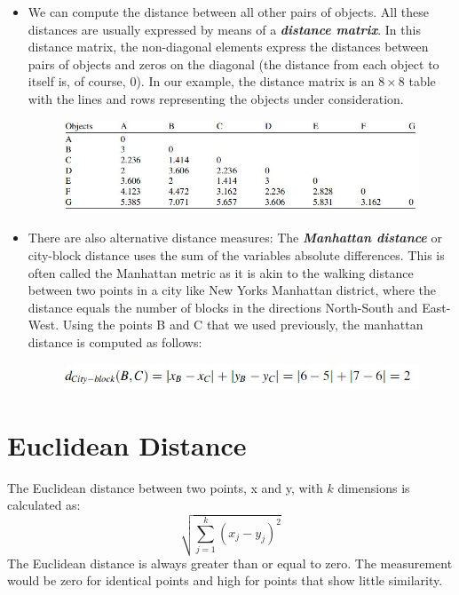 \documentclass[a4paper,12pt]{report}
\begin{document}
\begin{itemize}
	\item We can compute the distance between all other pairs of objects. All
	these distances are usually expressed by means of a \textit{\textbf{distance matrix}}. In this distance
	matrix, the non-diagonal elements express the distances between pairs of objects
	and zeros on the diagonal (the distance from each object to itself is, of course, 0). In
	our example, the distance matrix is an $8 \times 8$ table with the lines and rows
	representing the objects under consideration.
	\begin{figure}[h!]
		\begin{center}
			\includegraphics[scale=0.6]{images/DistanceMatrix.jpg}\\
		\end{center}
	\end{figure}
	
	\item There are also alternative distance measures: The \textbf{\textit{Manhattan distance}} or city-block distance uses the sum of the variables absolute differences. This is often called the Manhattan metric
	as it is akin to the walking distance between two points in a city like New Yorks
	Manhattan district, where the distance equals the number of blocks in the directions
	North-South and East-West. Using the points B and C that we used previously, the manhattan distance is computed as follows:
	\begin{figure}[h!]
		\begin{center}
			\includegraphics[scale=0.6]{images/Manhattan.jpg}\\
		\end{center}
	\end{figure}
	
	
	
	
	
	
\end{itemize}

\section{Euclidean Distance}
The Euclidean distance between two points, x and y, with $k$ dimensions is calculated as:
\[ \sqrt{ \sum^{k}_{j=1} ( x_j - y_j)^2 } \]
The Euclidean distance is always greater than or equal to zero. The measurement would be zero for identical points and high for points that show little similarity.
\end{document}
